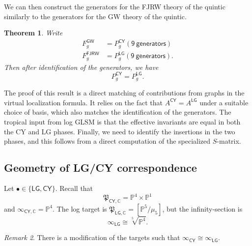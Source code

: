 \documentclass[10pt]{amsart}
\newtheorem{thm}{Theorem}[section]
\theoremstyle{definition}
\theoremstyle{remark}
\newtheorem{rmk}[thm]{Remark}
\theoremstyle{plain}
\theoremstyle{definition}
\theoremstyle{remark}
\newcommand{\C}{\mathbb{C}}
\renewcommand{\P}{\mathbb{P}}
\newcommand{\mf}[1]{\mathfrak{#1}}
\newcommand{\ms}[1]{\mathsf{#1}}
\newcommand{\1}{\mathbf{1}}
\newcommand{\2}{\mathbf{2}}
\newcommand{\3}{\mathbf{3}}
\newcommand{\GW}{\ms{GW}}
\newcommand{\FJRW}{\ms{FJRW}}
\newcommand{\LG}{\ms{LG}}
\newcommand{\CY}{\ms{CY}}
\begin{document}
We can then construct the generators for the FJRW theory of the quintic similarly to the generators for the GW theory of the quintic.
\begin{thm}
    Write
    \begin{align*}
        F_g^{\GW} &= P_g^{\ms{CY}} (\ms{9\ generators}) \\
        F_g^{\FJRW} &= P_g^{\LG}(\ms{9\ generators}).
    \end{align*}
    Then after identification of the generators, we have
    \[ P_g^{\ms{CY}} = P_g^{\LG}. \]
\end{thm}

The proof of this result is a direct matching of contributions from graphs in the virtual localization formula. It relies on the fact that $A^{\ms{CY}} = A^{\ms{LG}}$ under a suitable choice of basis, which also matches the identification of the generators. The tropical input from log GLSM is that the effective invariants are equal in both the CY and LG phases. Finally, we need to identify the insertions in the two phases, and this follows from a direct computation of the specialized $S$-matrix.

\subsection{Geometry of LG/CY correspondence}%
\label{sub:Geometry of LG/CY correspondence}

Let $\bullet \in \{\LG,\CY\}$. Recall that
\[ \mf{P}_{\CY, \C} = \P^4 \times \P^1 \]
and $\infty_{\CY, \C} = \P^4$. The log target is $\mf{P}_{\LG, \C} = [\P^5/\mu_5]$, but the infinity-section is
\[ \infty_{\LG} \cong \sqrt[5]{\P^4}. \]

\begin{rmk}
    There is a modification of the targets such that $\infty_{\CY} \cong \infty_{\LG}$.
\end{rmk}
\end{document}
